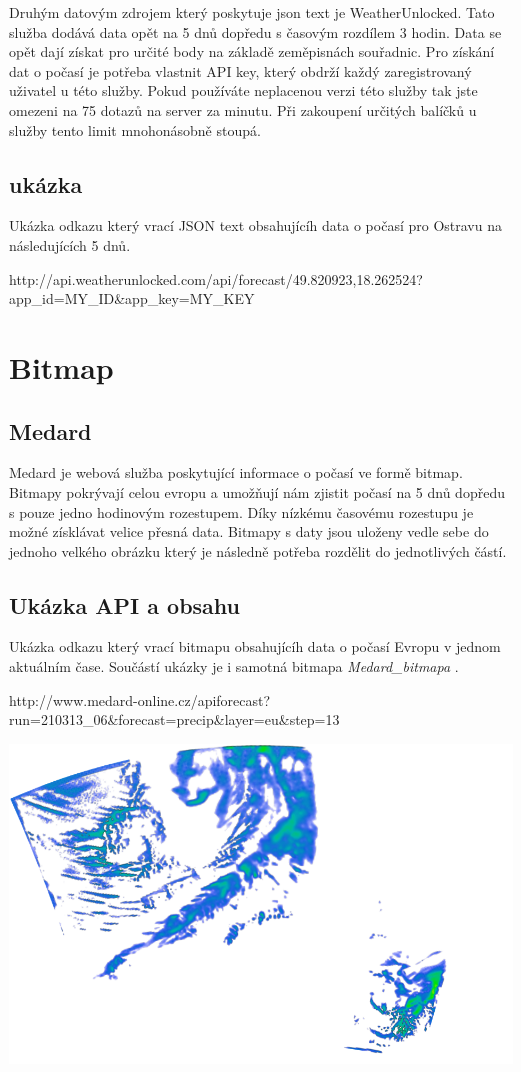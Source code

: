 \documentclass[czech,bachelor,dept460,male,csharp,cpdeclaration]{diploma}
\begin{document}
	Druhým datovým zdrojem který poskytuje json text je WeatherUnlocked. Tato služba dodává data opět na 5 dnů dopředu s časovým rozdílem 3 hodin. Data se opět dají získat pro určité body na základě zeměpisnách souřadnic. Pro získání dat o počasí je potřeba vlastnit API key, který obdrží každý zaregistrovaný uživatel u této služby. Pokud používáte neplacenou verzi této služby tak jste omezeni na 75 dotazů na server za minutu. Při zakoupení určitých balíčků u služby tento limit mnohonásobně stoupá.
	
	\subsection{ukázka}
	
	Ukázka odkazu který vrací JSON text obsahujícíh data o počasí pro Ostravu na následujících 5 dnů.
	
	http://api.weatherunlocked.com/api/forecast/49.820923,18.262524?app\_id=MY\_ID\&app\_key=MY\_KEY
	
	\section{Bitmap}
	\subsection{Medard}
	
	Medard je webová služba poskytující informace o počasí ve formě bitmap. Bitmapy pokrývají celou evropu a umožňují nám zjistit počasí na 5 dnů dopředu s pouze jedno hodinovým rozestupem. Díky nízkému časovému rozestupu je možné získlávat velice přesná data. Bitmapy s daty jsou uloženy vedle sebe do jednoho velkého obrázku který je následně potřeba rozdělit do jednotlivých částí.
	
	\subsection{Ukázka API a obsahu}
	
	Ukázka odkazu který vrací bitmapu obsahujícíh data o počasí Evropu v jednom aktuálním čase. Součástí ukázky je i samotná bitmapa \emph{Medard\_bitmapa} \cite{medard}.
	
	http://www.medard-online.cz/apiforecast?run=210313\_06\&forecast=precip\&layer=eu\&step=13
	
	\includegraphics[scale=0.5]{Data/Mdrd_ukazka.png}
	
\end{document}

